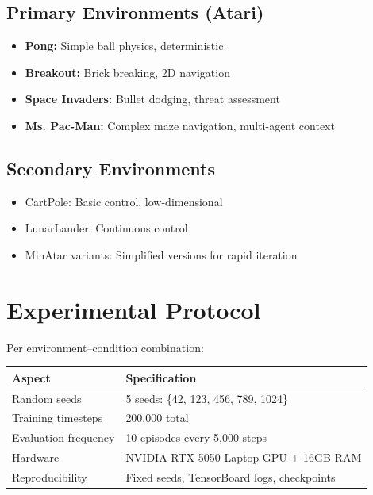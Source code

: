\documentclass[12pt,a4paper,openany]{report}
\begin{document}
\subsection{Primary Environments (Atari)}

\begin{itemize}
    \item \textbf{Pong:} Simple ball physics, deterministic
    \item \textbf{Breakout:} Brick breaking, 2D navigation
    \item \textbf{Space Invaders:} Bullet dodging, threat assessment
    \item \textbf{Ms. Pac-Man:} Complex maze navigation, multi-agent context
\end{itemize}

\subsection{Secondary Environments}

\begin{itemize}
    \item CartPole: Basic control, low-dimensional
    \item LunarLander: Continuous control
    \item MinAtar variants: Simplified versions for rapid iteration
\end{itemize}

\section{Experimental Protocol}

Per environment--condition combination:

\begin{table}[H]
\centering
\small
\begin{tabular}{ll}
\toprule
Aspect & Specification \\
\midrule
Random seeds & 5 seeds: \{42, 123, 456, 789, 1024\} \\
Training timesteps & 200,000 total \\
Evaluation frequency & 10 episodes every 5,000 steps \\
Hardware & NVIDIA RTX 5050 Laptop GPU + 16GB RAM \\
Reproducibility & Fixed seeds, TensorBoard logs, checkpoints \\
\bottomrule
\end{tabular}
\end{table}
\end{document}
